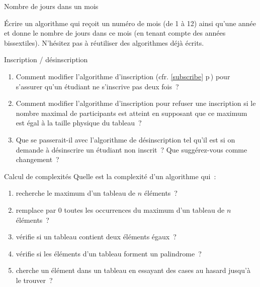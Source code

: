 	\begin{Exercice}{Nombre de jours dans un mois}

		Écrire un algorithme qui reçoit un numéro de mois (de 1 à 12)
		ainsi qu’une année et donne le nombre de jours dans ce mois
		(en tenant compte des années bissextiles).
		N’hésitez pas à réutiliser des algorithmes déjà écrits.
	\end{Exercice}



	\begin{Exercice}{Inscription / désinscription}

		\begin{enumerate}

			\item Comment modifier l’algorithme d’inscription (cfr.
				\ref{subscribe} p\,\pageref{subscribe}) pour s’assurer qu’un
				étudiant ne s’inscrive pas deux fois~?

			\item Comment modifier l’algorithme d’inscription pour refuser une
				inscription si le nombre maximal de participants est atteint en
				supposant que ce maximum est égal à la taille physique du
				tableau~?

			\item Que se passerait-il avec l’algorithme de désinscription tel
				qu’il est si on demande à désinscrire un étudiant non inscrit~?
				Que suggérez-vous comme changement~?

		\end{enumerate}
	
	\end{Exercice}


	\begin{Exercice}{Calcul de complexités}
		Quelle est la complexité d’un algorithme qui~:		
		\begin{enumerate}[label=\alph*)]
			\item 
				recherche le maximum d’un tableau de $n$ éléments~?
			\item 
				remplace par 0 toutes les occurrences du maximum 
				d’un tableau de $n$ éléments~?
			\item 
				vérifie si un tableau contient deux éléments égaux~?
			\item 
				vérifie si les éléments d’un tableau forment un palindrome~?
			\item
				cherche un élément dans un tableau 
				en essayant des cases au hasard jusqu’à le trouver~?
		\end{enumerate}
	\end{Exercice}


